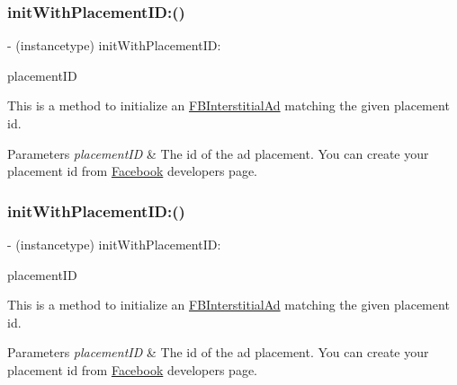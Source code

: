 \subsubsection{\texorpdfstring{init\+With\+Placement\+I\+D\+:()}{initWithPlacementID:()}\hspace{0.1cm}{\footnotesize\ttfamily [3/5]}}
{\footnotesize\ttfamily -\/ (instancetype) init\+With\+Placement\+I\+D\+: \begin{DoxyParamCaption}\item[{(N\+S\+String $\ast$)}]{placement\+ID }\end{DoxyParamCaption}}

This is a method to initialize an \hyperlink{interfaceFBInterstitialAd}{F\+B\+Interstitial\+Ad} matching the given placement id.


\begin{DoxyParams}{Parameters}
{\em placement\+ID} & The id of the ad placement. You can create your placement id from \hyperlink{interfaceFacebook}{Facebook} developers page. \\
\hline
\end{DoxyParams}
\mbox{\label{interfaceFBInterstitialAd_afb4f482b5ab19d486c77785c7794111d}} 
\subsubsection{\texorpdfstring{init\+With\+Placement\+I\+D\+:()}{initWithPlacementID:()}\hspace{0.1cm}{\footnotesize\ttfamily [4/5]}}
{\footnotesize\ttfamily -\/ (instancetype) init\+With\+Placement\+I\+D\+: \begin{DoxyParamCaption}\item[{(N\+S\+String $\ast$)}]{placement\+ID }\end{DoxyParamCaption}}

This is a method to initialize an \hyperlink{interfaceFBInterstitialAd}{F\+B\+Interstitial\+Ad} matching the given placement id.


\begin{DoxyParams}{Parameters}
{\em placement\+ID} & The id of the ad placement. You can create your placement id from \hyperlink{interfaceFacebook}{Facebook} developers page. \\
\hline
\end{DoxyParams}
\mbox{\label{interfaceFBInterstitialAd_afb4f482b5ab19d486c77785c7794111d}} 
